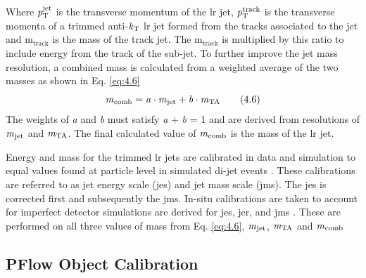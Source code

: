Where $\textrm{\textit{p}}_{\textrm{T}}^{\textrm{jet}}$ is the transverse momentum of the \gls{lr} jet, $\textrm{\textit{p}}_{\textrm{T}}^{\textrm{track}}$ is the transverse 
momenta of a trimmed anti-$\textrm{\textit{k}}_{\textrm{T}}$ \gls{lr} jet formed from the tracks associated to the jet and $\textrm{m}_{\textrm{track}}$ is the mass of the track jet. The $\textrm{m}_{\textrm{track}}$
is multiplied by this ratio to include energy from the track of the sub-jet. To further improve the jet mass resolution, a combined mass is calculated from a weighted average of the 
two masses as shown in Eq. \ref{eq:4.6}
%
\begin{equation}\label{eq:4.6}
    \textrm{\textit{m}}_{\textrm{comb}} = \textrm{\textit{a}} \cdot \textrm{\textit{m}}_{\textrm{jet}} + \textrm{\textit{b}} \cdot \textrm{\textit{m}}_{\textrm{TA}}
\tag{4.6}
\end{equation}
%
The weights of \textit{a} and \textit{b} must satisfy \textit{a} $+$ \textit{b} = 1 and are derived from resolutions of $\textrm{\textit{m}}_{\textrm{jet}}$ and
$\textrm{\textit{m}}_{\textrm{TA}}$. The final calculated value of $\textrm{\textit{m}}_{\textrm{comb}}$ is the mass of the \gls{lr} jet.
\par
Energy and mass for the trimmed \gls{lr} jets are calibrated in data and simulation to equal values found at particle level in simulated di-jet events \cite{LR-jets-opt}. 
These calibrations are referred to as jet energy scale (\gls{jes}) and jet mass scale (\gls{jms}). The \gls{jes} is corrected first and subsequently the \gls{jms}. In-situ 
calibrations are taken to account for imperfect detector simulations are derived for \gls{jes}, \gls{jer}, and \gls{jms} \cite{LR-jets-cali}. These are performed on all three values of mass from Eq. \ref{eq:4.6}, 
$\textrm{\textit{m}}_{\textrm{jet}}$, $\textrm{\textit{m}}_{\textrm{TA}}$ and $\textrm{\textit{m}}_{\textrm{comb}}$

\subsection{PFlow Object Calibration}

